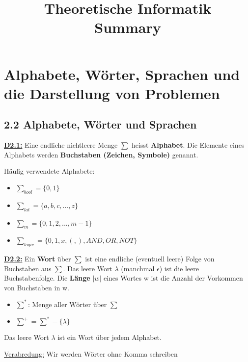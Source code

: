 \documentclass[8pt]{extreport}
\title{Theoretische Informatik\\Summary}
\begin{document}
	\maketitle
	\newpage

\chapter{Alphabete, Wörter, Sprachen und die Darstellung von Problemen}

\section{2.2 Alphabete, Wörter und Sprachen}

\underline{\textbf{D2.1:}} Eine endliche nichtleere Menge $\sum$ heisst \textbf{Alphabet}. Die Elemente eines Alphabets werden \textbf{Buchstaben (Zeichen, Symbole)} genannt.

Häufig verwendete Alphabete:
\begin{itemize}
\item $\sum_{bool} = \{0,1\}$
\item $\sum_{lat} = \{a,b,c,...,z\}$
\item $\sum_m = \{0,1,2,...,m-1\}$
\item $\sum_{logic} = \{0,1,x,(,),AND,OR,NOT\}$

\end{itemize}

\underline{\textbf{D2.2:}} Ein \textbf{Wort} über $\sum$ ist eine endliche (eventuell leere) Folge von Buchstaben aus $\sum$. Das leere Wort $\lambda$ (manchmal $\epsilon$) ist die leere Buchstabenfolge. Die \textbf{Länge} $|w|$ eines Wortes w ist die Anzahl der Vorkommen von Buchstaben in w.

\begin{itemize}
\item $\sum^{*}$: Menge aller Wörter über $\sum$
\item $\sum^{+} = \sum^{*}-\{\lambda\}$
\end{itemize}

Das leere Wort $\lambda$ ist ein Wort über jedem Alphabet.

\underline{Verabredung:} Wir werden Wörter ohne Komma schreiben
\end{document}
